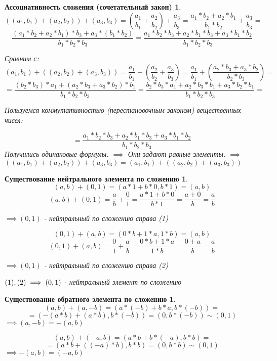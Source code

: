 \documentclass[14pt,a4paper,oneside,russian]{article}
\newtheorem*{axiom1}{Ассоциативность сложения (сочетательный закон)}
\newtheorem*{axiom2}{Существование нейтрального элемента по сложению}
\newtheorem*{axiom3}{Существование обратного элемента по сложению}
\begin{document}
\begin{axiom1}
$$
((a_1, b_1) + (a_2, b_2)) + (a_3, b_3) =
(\frac{a_1}{b_1} + \frac{a_2}{b_2}) + \frac{a_3}{b_3} =
\frac{a_1 * b_2 + a_2 * b_1}{b_1 * b_2} + \frac{a_3}{b_3} =
$$
$$
\frac{(a_1 * b_2 + a_2 * b_1) * b_3 + a_3 * (b_1 * b_2)}{b_1 * b_2 * b_3} =
\frac{a_1 * b_2 * b_3 + a_2 * b_1 * b_3 + a_3 * b_1 * b_2}{b_1 * b_2 * b_3}
$$

Сравним с:
$$
( a_1, b_1 ) + (( a_2, b_2 ) + ( a_3, b_3 )) =
\frac{a_1}{b_1} + (\frac{a_2}{b_2} + \frac{a_3}{b_3}) =
\frac{a_1}{b_1} + (\frac{a_2 * b_3 + a_3 * b_2}{b_2 * b_3}) =
$$
$$
= \frac{(b_2 * b_3) * a_1 + (a_2 * b_3 + a_3 * b_2) * b_1}{b_1 * b_2 * b_3} =
\frac{b_2 * b_3 * a_1 + a_2 * b_3 * b_1 + a_3 * b_2 * b_1}{b_1 * b_2 * b_3} =
$$

Пользуемся коммутативностью (перестановочным законом) вещественных чисел:

$$
= \frac{a_1 * b_2 * b_3 + a_2 * b_1 * b_3 + a_3 * b_1 * b_2}{b_1 * b_2 * b_3}
$$
Получились одинаковые формулы.
$ \implies $
Они задают равные элементы.
$ \implies $
$
((a_1, b_1) + (a_2, b_2)) + (a_3, b_3) =
(a_1, b_1) + ((a_2, b_2) + (a_3, b_3))
$
\end{axiom1}
\newpage

\begin{axiom2}
$$ (a, b) + (0, 1) = (a * 1 + b * 0, b * 1) = (a, b) $$
$$
(a, b) + (0, 1) =
\frac{a}{b} + \frac{0}{1} =
\frac{a * 1 + b * 0}{b * 1} =
\frac{a + 0}{b} =
\frac{a}{b}
$$

$ \implies (0, 1) $ - нейтральный по сложению справа (1)

$$ (0, 1) + (a, b) = (0 * b + 1 * a, 1 * b) = (a, b) $$
$$
(0, 1) + (a, b) =
\frac{0}{1} + \frac{a}{b} =
\frac{0 * b + 1 * a}{1 * b} =
\frac{0 + a}{b} =
\frac{a}{b}
$$

$ \implies (0, 1) $ - нейтральный по сложению справа (2)

$ \newline (1), (2) \implies (0, 1) $ - нейтральный элемент по сложению
\end{axiom2}
\newpage

\begin{axiom3}
$$
(a, b) + (a, -b) =
(a * (-b) + b * a, b * (-b)) =
$$
$$
= (-(a * b) + (a * b), b * (-b)) =
(0, b * (-b)) \sim (0, 1)
$$
$ \implies (a, -b) = -(a, b) $

$$
(a, b) + (-a, b) =
(a * b + b * (-a), b * b) =
$$
$$
= (a * b + ((-a) * b), b * b)
= (0, b * b) \sim (0, 1)
$$
$ \implies -(a, b) = (-a, b) $
\end{axiom3}
\newpage
\end{document}
